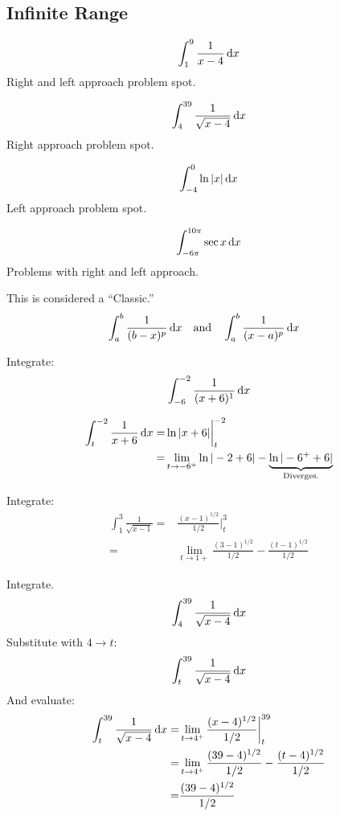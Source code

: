 \subsection{Infinite Range}

\begin{ex}
	\[ \int^{9}_1 \frac{1}{x-4}\,\mathrm{d} x \]
	Right and left approach problem spot.
\end{ex}
\begin{ex}
	\[ \int^{39}_{4}\frac{1}{\sqrt{x-4}}\,\mathrm{d} x \]
	Right approach problem spot.
\end{ex}
\begin{ex}
	\[ \int^0_{-4} \ln{|x|} \,\mathrm{d} x \]
	Left approach problem spot.
\end{ex}
\begin{ex}
  \[ \int^{10 \pi}_{-6\pi} \sec x \,\mathrm{d} x \]
  Problems with right and left approach.
\end{ex}
\begin{ex}
This is considered a ``Classic.''
  \begin{align*}
    &\int^{b}_{a} \frac{1}{(b-x)^p} \,\mathrm{d} x && \text{and} &&\int^{b}_{a} \frac{1}{(x-a)^p} \,\mathrm{d} x
  \end{align*}
\end{ex}
\begin{ex}
  Integrate:
    \[ \int^{-2}_{-6} \frac{1}{(x+6)^1} \,\mathrm{d} x \]
  \begin{sol}
    \begin{align*}
      \int^{-2}_t \frac{1}{x+6} \,\mathrm{d} x
      =& \ln{|x+6|}\bigg|^{-2}_t \\
      =& \lim_{t \to -6^+} \ln{|-2+6|}-\underbrace{\ln{|-6^++6|}}_\text{Diverges.}
    \end{align*}
  \end{sol}
\end{ex}
\begin{ex}
  Integrate:
  \begin{align*}
    \int^{3}_{1} \frac{1}{\sqrt{x-1}}
    =& \frac{(x-1)^{1/2}}{1/2}\bigg|^3_t \\
    =& \lim_{t \to 1+} \frac{(3-1)^{1/2}}{1/2}-\frac{(t-1)^{1/2}}{1/2}
  \end{align*}
\end{ex}
\begin{ex}
  Integrate.
  \[ \int^{39}_4 \frac{1}{\sqrt{x-4}} \,\mathrm{d} x \]
  Substitute with $4 \to t$:
  \[ \int^{39}_t \frac{1}{\sqrt{x-4}} \,\mathrm{d} x \]
  And evaluate:
  \begin{align*}
    \int^{39}_t \frac{1}{\sqrt{x-4}} \,\mathrm{d} x
    =& \lim_{t \to 4^+} \frac{(x-4)^{1/2}}{1/2} \bigg|^{39}_t \\
    =& \lim_{t \to 4^+} \frac{(39-4)^{1/2}}{1/2}-\frac{(t-4)^{1/2}}{1/2} \\
    =& \frac{(39-4)^{1/2}}{1/2}
  \end{align*}
\end{ex}
